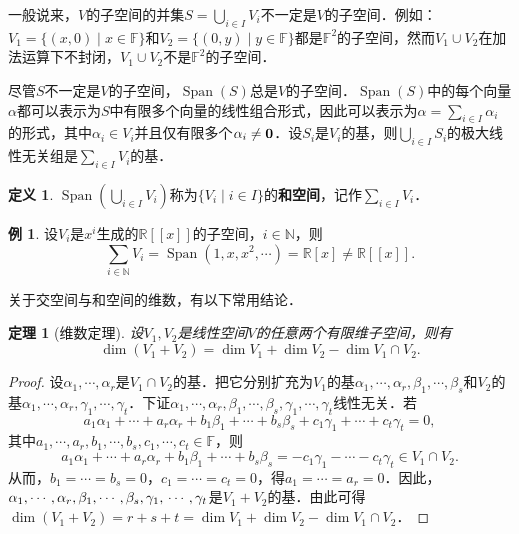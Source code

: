 \documentclass[a4paper,fontset=windows]{ctexbook}
\newtheorem{theorem}{定理}[chapter]
\theoremstyle{definition}
\newtheorem{definition}{定义}[chapter]
\newtheorem{example}{例}[chapter]
\DeclareMathOperator{\Span}{Span}
\begin{document}
\medskip 一般说来，$V$的子空间的并集$S=\bigcup\limits_{i\in I}V_i$不一定是$V$的子空间．例如：$V_1=\{(x,0)\mid x\in\mathbb{F}\}$和$V_2=\{(0,y)\mid y\in\mathbb{F}\}$都是$\mathbb{F}^2$的子空间，然而$V_1\cup V_2$在加法运算下不封闭，$V_1\cup V_2$不是$\mathbb{F}^2$的子空间．

尽管$S$不一定是$V$的子空间，$\Span(S)$总是$V$的子空间．$\Span(S)$中的每个向量$\alpha$都可以表示为$S$中有限多个向量的线性组合形式，因此可以表示为$\alpha=\sum\limits_{i\in I}\alpha_i$的形式，其中$\alpha_i\in V_i$并且仅有限多个$\alpha_i\ne{\bf 0}$．设$S_i$是$V_i$的基，则$\bigcup\limits_{i\in I}S_i$的极大线性无关组是$\sum\limits_{i\in I}V_i$的基．

\begin{definition}
$\Span(\bigcup\limits_{i\in I}V_i)$称为$\{V_i\mid i\in I\}$的{\bf 和空间}，记作$\sum\limits_{i\in I}V_i$．
\end{definition}

\begin{example}
设$V_i$是$x^i$生成的$\mathbb{R}[[x]]$的子空间，$i\in\mathbb{N}$，则
$$\sum_{i\in\mathbb{N}}V_i=\Span(1,x,x^2,\cdots)=\mathbb{R}[x]\ne\mathbb{R}[[x]].$$
\end{example}

关于交空间与和空间的维数，有以下常用结论．

\begin{theorem}[维数定理]\label{thm8.15}
设$V_1,V_2$是线性空间$V$的任意两个有限维子空间，则有
$$\dim(V_1+V_2)=\dim V_1+\dim V_2-\dim V_1\cap V_2.$$
\end{theorem}

\begin{proof}
设$\alpha_1,\cdots,\alpha_r$是$V_1\cap V_2$的基．把它分别扩充为$V_1$的基$\alpha_1,\cdots,\alpha_r,\beta_1,\cdots,\beta_s$和$V_2$的基$\alpha_1,\cdots,\alpha_r,\gamma_1,\cdots,\gamma_t$．下证$\alpha_1,\cdots,\alpha_r,\beta_1,\cdots,\beta_s,\gamma_1,\cdots,\gamma_t$线性无关．若
$$a_1\alpha_1+\cdots+a_r\alpha_r+b_1\beta_1+\cdots+b_s\beta_s+c_1\gamma_1+\cdots+c_t\gamma_t=0,$$
其中$a_1,\cdots,a_r,b_1,\cdots,b_s,c_1,\cdots,c_t\in\mathbb{F}$，则
$$a_1\alpha_1+\cdots+a_r\alpha_r+b_1\beta_1+\cdots+b_s\beta_s=-c_1\gamma_1-\cdots-c_t\gamma_t\in V_1\cap V_2.$$
从而，$b_1=\cdots=b_s=0$，$c_1=\cdots=c_t=0$，得$a_1=\cdots=a_r=0$．因此，$\alpha_1,\cdots,\alpha_r,\beta_1,\cdots,\beta_s,\gamma_1, \\ \cdots,\gamma_t$是$V_1+V_2$的基．由此可得$\dim(V_1+V_2)=r+s+t=\dim V_1+\dim V_2-\dim V_1\cap V_2$．
\end{proof}
\end{document}
